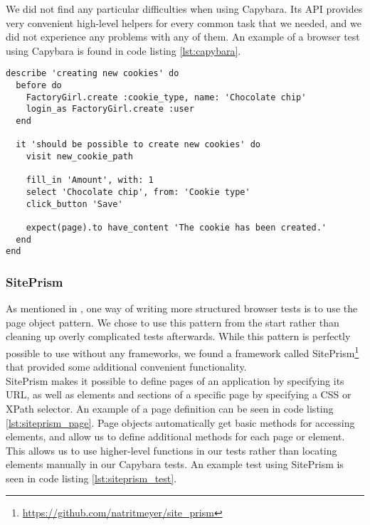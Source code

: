 We did not find any particular difficulties when using Capybara. Its API
provides very convenient high-level helpers for every common task that
we needed, and we did not experience any problems with any of them. An
example of a browser test using Capybara is found in code listing
\ref{lst:capybara}.\\


\begin{lstlisting}[caption=A browser test written in RSpec using Capybara.,
                   label=lst:capybara, float=t]
describe 'creating new cookies' do
  before do
    FactoryGirl.create :cookie_type, name: 'Chocolate chip'
    login_as FactoryGirl.create :user
  end

  it 'should be possible to create new cookies' do
    visit new_cookie_path

    fill_in 'Amount', with: 1
    select 'Chocolate chip', from: 'Cookie type'
    click_button 'Save'

    expect(page).to have_content 'The cookie has been created.'
  end
end
\end{lstlisting}


\subsubsection{SitePrism}

As mentioned in , one way of writing more
structured browser tests is to use the page object pattern. We chose to
use this pattern from the start rather than cleaning up overly
complicated tests afterwards. While this pattern is perfectly possible
to use without any frameworks, we found a framework called
SitePrism\footnote{\url{https://github.com/natritmeyer/site_prism}}
that provided some additional convenient functionality.\\

SitePrism makes it possible to define pages of an application by
specifying its URL, as well as elements and sections of a specific page
by specifying a CSS or XPath selector. An example of a page definition
can be seen in code listing \ref{lst:siteprism_page}. Page objects
automatically get basic methods for accessing elements, and allow us to
define additional methods for each page or element. This allows us to
use higher-level functions in our tests rather than locating elements
manually in our Capybara tests. An example test using SitePrism is seen
in code listing \ref{lst:siteprism_test}.\\

